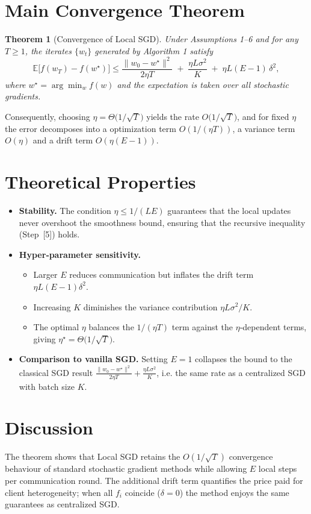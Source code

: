 \documentclass{article}
\newtheorem{theorem}{Theorem}
\begin{document}
\section*{Main Convergence Theorem}
\begin{theorem}[Convergence of Local SGD]\label{thm:main}
Under Assumptions 1–6 and for any $T\ge1$, the iterates $\{w_t\}$ generated by
Algorithm 1 satisfy
\[
\mathbb{E}\!\bigl[f(w_T)-f(w^\star)\bigr]
\le
\frac{\|w_0-w^\star\|^2}{2\eta T}
\;+\;
\frac{\eta L\sigma^2}{K}
\;+\;
\eta L (E-1)\,\delta^2 ,
\]
where $w^\star=\arg\min_{w}f(w)$ and the expectation is taken over all stochastic
gradients.
\end{theorem}
Consequently, choosing $\eta = \Theta\!\bigl(1/\sqrt{T}\bigr)$ yields the
rate $O\!\bigl(1/\sqrt{T}\bigr)$, and for fixed $\eta$ the error decomposes into a
optimization term $O(1/(\eta T))$, a variance term $O(\eta)$ and a drift term
$O(\eta(E-1))$.

\section*{Theoretical Properties}
\begin{itemize}
\item \textbf{Stability.} The condition $\eta\le 1/(L E)$ guarantees that the
local updates never overshoot the smoothness bound, ensuring that the
recursive inequality (Step~[5]) holds.
\item \textbf{Hyper‑parameter sensitivity.}
    \begin{itemize}
    \item Larger $E$ reduces communication but inflates the drift term
      $\eta L (E-1)\delta^2$.
    \item Increasing $K$ diminishes the variance contribution $\eta L\sigma^2/K$.
    \item The optimal $\eta$ balances the $1/(\eta T)$ term against the
      $\eta$‑dependent terms, giving $\eta^\star = \Theta\bigl(1/\sqrt{T}\bigr)$.
    \end{itemize}
\item \textbf{Comparison to vanilla SGD.} Setting $E=1$ collapses the bound to the
classical SGD result $\frac{\|w_0-w^\star\|^2}{2\eta T}+ \frac{\eta L\sigma^2}{K}$,
i.e. the same rate as a centralized SGD with batch size $K$.
\end{itemize}

\section*{Discussion}
The theorem shows that Local SGD retains the $O(1/\sqrt{T})$ convergence
behaviour of standard stochastic gradient methods while allowing $E$ local
steps per communication round. The additional drift term quantifies the
price paid for client heterogeneity; when all $f_i$ coincide ($\delta=0$) the
method enjoys the same guarantees as centralized SGD.
\end{document}
